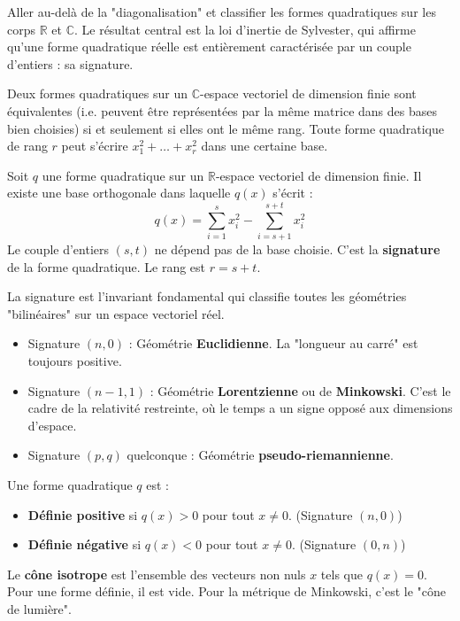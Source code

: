\begin{objectif}
    Aller au-delà de la "diagonalisation" et classifier les formes quadratiques sur les corps $\mathbb{R}$ et $\mathbb{C}$. Le résultat central est la loi d'inertie de Sylvester, qui affirme qu'une forme quadratique réelle est entièrement caractérisée par un couple d'entiers : sa signature.
\end{objectif}

\begin{theorem}
    Deux formes quadratiques sur un $\mathbb{C}$-espace vectoriel de dimension finie sont équivalentes (i.e. peuvent être représentées par la même matrice dans des bases bien choisies) si et seulement si elles ont le même rang. Toute forme quadratique de rang $r$ peut s'écrire $x_1^2 + \dots + x_r^2$ dans une certaine base.
\end{theorem}

\begin{theorem}
    Soit $q$ une forme quadratique sur un $\mathbb{R}$-espace vectoriel de dimension finie. Il existe une base orthogonale dans laquelle $q(x)$ s'écrit :
    $$ q(x) = \sum_{i=1}^s x_i^2 - \sum_{i=s+1}^{s+t} x_i^2 $$
    Le couple d'entiers $(s,t)$ ne dépend pas de la base choisie. C'est la \textbf{signature} de la forme quadratique. Le rang est $r=s+t$.
\end{theorem}

\begin{remark}
    La signature est l'invariant fondamental qui classifie toutes les géométries "bilinéaires" sur un espace vectoriel réel.
    \begin{itemize}
        \item Signature $(n,0)$ : Géométrie \textbf{Euclidienne}. La "longueur au carré" est toujours positive.
        \item Signature $(n-1,1)$ : Géométrie \textbf{Lorentzienne} ou de \textbf{Minkowski}. C'est le cadre de la relativité restreinte, où le temps a un signe opposé aux dimensions d'espace.
        \item Signature $(p,q)$ quelconque : Géométrie \textbf{pseudo-riemannienne}.
    \end{itemize}
\end{remark}

\begin{definition}
    Une forme quadratique $q$ est :
    \begin{itemize}
        \item \textbf{Définie positive} si $q(x)>0$ pour tout $x \neq 0$. (Signature $(n,0)$)
        \item \textbf{Définie négative} si $q(x)<0$ pour tout $x \neq 0$. (Signature $(0,n)$)
    \end{itemize}
    Le \textbf{cône isotrope} est l'ensemble des vecteurs non nuls $x$ tels que $q(x)=0$. Pour une forme définie, il est vide. Pour la métrique de Minkowski, c'est le "cône de lumière".
\end{definition}
